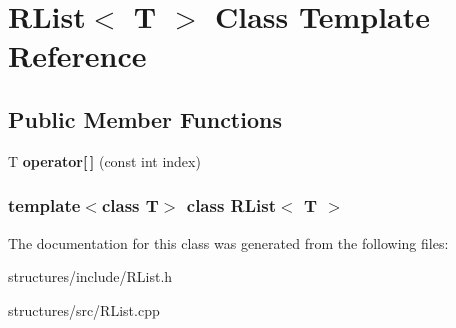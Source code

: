 \hypertarget{classRList}{
\section{RList$<$ T $>$ Class Template Reference}
\label{classRList}
}
\subsection*{Public Member Functions}
\begin{DoxyCompactItemize}
\item 
\hypertarget{classRList_a5d999d1f42d4c5be12913570966ef21b}{
T {\bfseries operator\mbox{[}$\,$\mbox{]}} (const int index)}
\label{classRList_a5d999d1f42d4c5be12913570966ef21b}

\end{DoxyCompactItemize}
\subsubsection*{template$<$class T$>$ class RList$<$ T $>$}



The documentation for this class was generated from the following files:\begin{DoxyCompactItemize}
\item 
structures/include/RList.h\item 
structures/src/RList.cpp\end{DoxyCompactItemize}
